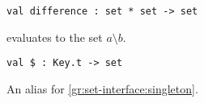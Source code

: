 \begin{cluster}
\label{grp:grm:set-interface::difference}

\begin{gram}[difference]
\label{grm:set-interface::difference}
\begin{verbatim}
val difference : set * set -> set
\end{verbatim}
 evaluates to the set $a \setminus b$.

\end{gram}
\end{cluster}

\begin{cluster}
\label{grp:grm:set-interface::alias}

\begin{gram}[\$]
\label{grm:set-interface::alias}
\begin{verbatim}
val $ : Key.t -> set
\end{verbatim}
An alias for \ref{gr:set-interface:singleton}.

\end{gram}
\end{cluster}

